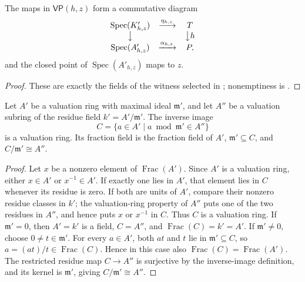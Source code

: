 \begin{lemma}
  \label{lemma:nagata-dense-valuation-probe}
  \leanok

  The maps in $\mathsf{VP}(h,z)$ form a commutative diagram
  \[
    \begin{array}{ccc}
      \operatorname{Spec}(K'_{h,z})&\xrightarrow{\eta_{h,z}}&T\\
      \big\downarrow&&\big\downarrow h\\
      \operatorname{Spec}(A'_{h,z})&\xrightarrow{\alpha_{h,z}}&P,
    \end{array}
  \]
  and the closed point of $\operatorname{Spec}(A'_{h,z})$ maps to $z$.
\end{lemma}

\begin{proof}
  \leanok
  These are exactly the fields of the witness selected in
  ; nonemptiness is
  .
\end{proof}


\begin{lemma}
  \label{lemma:nagata-composite-valuation-ring}
  \leanok

  Let \(A'\) be a valuation ring with maximal ideal \(\mathfrak m'\), and let
  \(A''\) be a valuation subring of the residue field
  \(k'=A'/\mathfrak m'\).  The inverse image
  \[
    C=\{a\in A'\mid a\bmod\mathfrak m'\in A''\}
  \]
  is a valuation ring.  Its fraction field is the fraction field of \(A'\),
  \(\mathfrak m'\subseteq C\), and \(C/\mathfrak m'\cong A''\).
\end{lemma}

\begin{proof}
  \leanok
  Let \(x\) be a nonzero element of \(\operatorname{Frac}(A')\).  Since
  \(A'\) is a valuation ring, either \(x\in A'\) or \(x^{-1}\in A'\).  If
  exactly one lies in \(A'\), that element lies in \(C\) whenever its residue
  is zero.  If both are units of \(A'\), compare their nonzero residue classes
  in \(k'\); the valuation-ring property of \(A''\) puts one of the two
  residues in \(A''\), and hence puts \(x\) or \(x^{-1}\) in \(C\).  Thus
  \(C\) is a valuation ring.  If $\mathfrak m'=0$, then $A'=k'$ is a field,
  $C=A''$, and $\operatorname{Frac}(C)=k'=A'$.  If
  $\mathfrak m'\ne0$, choose $0\ne t\in\mathfrak m'$.  For every $a\in A'$,
  both $at$ and $t$ lie in $\mathfrak m'\subseteq C$, so
  $a=(at)/t\in\operatorname{Frac}(C)$.  Hence in this case also
  $\operatorname{Frac}(C)=\operatorname{Frac}(A')$.  The restricted residue
  map $C\to A''$ is surjective by the inverse-image definition, and its
  kernel is $\mathfrak m'$, giving $C/\mathfrak m'\cong A''$.
\end{proof}

